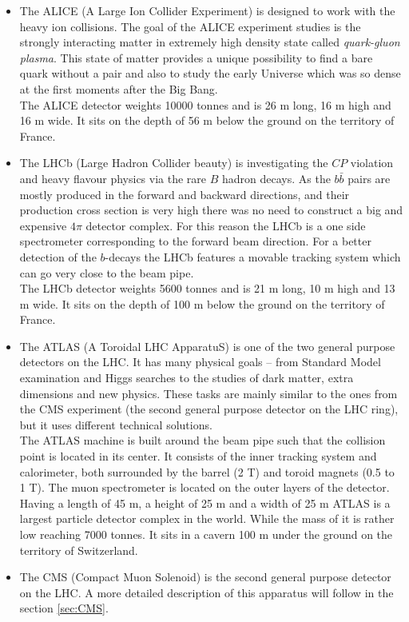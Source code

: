 \begin{itemize}
 \item The ALICE (A Large Ion Collider Experiment)\cite{ALICEtdr} is designed to
 work with the heavy ion collisions. The goal of the ALICE experiment studies is
 the strongly interacting matter in extremely high density state called \textit{quark-gluon plasma}. This 
 state of matter provides a unique possibility to find a bare quark without a pair and also to study the early
 Universe which was so dense at the first moments after the Big Bang.
 \\
 The ALICE detector weights 10000 tonnes and is 26 m long, 16 m high and 16 m wide. It sits on the depth of
 56 m below the ground on the territory of France.
 
 \item The LHCb (Large Hadron Collider beauty)\cite{LHCb} is investigating the $CP$ violation and heavy flavour physics via
 the rare $B$ hadron decays. As the $b\bar{b}$ pairs are mostly produced in the forward and backward directions, 
 and their production cross section is very high there was no need to construct a big and expensive $4\pi$ detector 
 complex. For this reason the LHCb is a one side spectrometer corresponding to the forward beam direction.
 For a better detection of the $b$-decays the LHCb features a movable tracking system which can go very close
 to the beam pipe.
 \\
 The LHCb detector weights 5600 tonnes and is 21 m long, 10 m high and 13 m wide. It sits on the depth of 100 m 
 below the ground on the territory of France.
 
 \item The ATLAS (A Toroidal LHC ApparatuS)\cite{ATLAS} is one of the two general purpose detectors on the LHC. It has many physical
 goals -- from Standard Model examination and Higgs searches to the studies of dark matter, extra dimensions and new physics.
 These tasks are mainly similar to the ones from the CMS experiment (the second general purpose detector on the LHC ring), but
 it uses different technical solutions.
 \\
 The ATLAS machine is built around the beam pipe such that the collision point is located in its center. It consists of the 
 inner tracking system and calorimeter, both surrounded by the barrel (2 T) and toroid magnets (0.5 to 1 T). The muon spectrometer
 is located on the outer layers of the detector.
 \\
 Having a length of 45 m, a height of 25 m and a width of 25 m ATLAS is a largest particle detector complex in the world. While the mass 
 of it is rather low reaching 7000 tonnes. It sits in a cavern 100 m under the ground on the territory of Switzerland.
 
 \item The CMS (Compact Muon Solenoid) is the second general purpose detector on the LHC. A more detailed description of this apparatus will follow in the
 section \ref{sec:CMS}.
 
\end{itemize}


